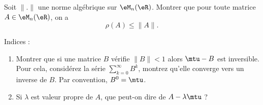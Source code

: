 \begin{exercice}\label{exoGeomAnal-0044}

Soit $\|.\|$ une norme algébrique sur $\eM_n(\eR)$. Montrer que pour toute matrice $A\in \eM_n(\eR)$, on a 
\begin{equation}
    \rho(A)\le\|A\|.
\end{equation}

Indices : 
\begin{enumerate}
    \item Montrer que si une matrice $B$ vérifie $\|B\|<1$ alors $\mtu-B$ est inversible. Pour cela, considérez la série \( \sum_{k=0}^{\infty}B^k\), montrez qu'elle converge vers un inverse de \( B\). Par convention, \( B^0=\mtu\).
\item Si $\lambda$ est valeur propre de $A$, que peut-on dire de $A-\lambda \mtu$ ?
\end{enumerate}

\end{exercice}
